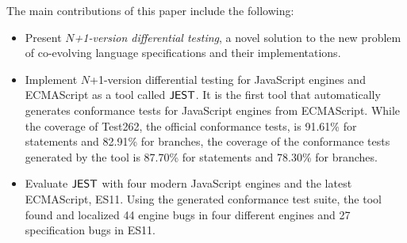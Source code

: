 The main contributions of this paper include the following:
\begin{itemize}
  \item Present \textit{$N$+1-version differential testing}, a novel solution to the new
    problem of co-evolving language specifications and their implementations.
  \item Implement $N$+1-version differential testing for JavaScript engines and
    ECMAScript as a tool called $\tool$. It is the first tool that automatically generates conformance
    tests for JavaScript engines from ECMAScript.  While the coverage
    of Test262, the official conformance tests, is 91.61\% for statements
    and 82.91\% for branches, the coverage of the conformance tests generated by the tool
    is 87.70\% for statements and 78.30\% for branches.
  \item Evaluate $\tool$ with four modern JavaScript engines and the latest
    ECMAScript, ES11.  Using the generated conformance test
    suite, the tool found and localized 44 engine bugs in four different
    engines and 27 specification bugs in ES11.
\end{itemize}
